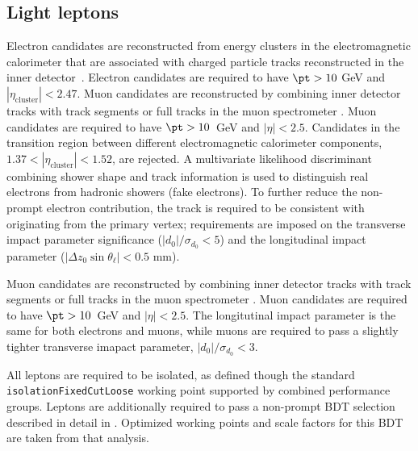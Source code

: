 \subsection{Light leptons}
\label{subsec:leps}

Electron candidates are reconstructed from energy clusters in the electromagnetic calorimeter that are associated with charged particle tracks reconstructed in the inner detector~\cite{ATLAS-CONF-2016-024}. Electron candidates are required to have $\pt > 10$ GeV and $|\eta_\textrm{cluster}| < 2.47$. Muon candidates are reconstructed by combining inner detector tracks with track segments or full tracks in the muon spectrometer \cite{PERF-2014-05}. Muon candidates are required to have $\pt > 10$~GeV and $|\eta| < 2.5$. Candidates in the transition region between different electromagnetic calorimeter components, $1.37 < |\eta_\textrm{cluster}| < 1.52$, are rejected. A multivariate likelihood discriminant combining shower shape and track information is used to distinguish real electrons from hadronic showers (fake electrons). To further reduce the non-prompt electron contribution, the track is required to be consistent with originating from the primary vertex; requirements are imposed on the transverse impact parameter significance ($|d_0|/\sigma_{d_0}<5$) and the longitudinal impact parameter ($|\Delta z_0 \sin \theta_\ell| < 0.5$ mm).
                   
Muon candidates are reconstructed by combining inner detector tracks with track segments or full tracks in the muon spectrometer \cite{PERF-2014-05}. Muon candidates are required to have $\pt > 10$~GeV and $|\eta| < 2.5$. The longitutinal impact parameter is the same for both electrons and muons, while muons are required to pass a slightly tighter transverse imapact parameter, $|d_0|/\sigma_{d_0}<3$. 

All leptons are required to be isolated, as defined though the standard \verb|isolationFixedCutLoose| working point supported by combined performance groups. Leptons are additionally required to pass a non-prompt BDT selection described in detail in \cite{ttH_paper}. Optimized working points and scale factors for this BDT are taken from that analysis.


